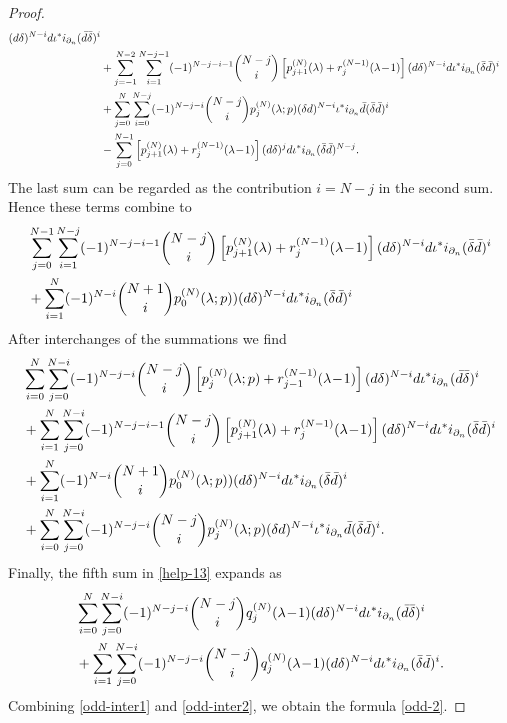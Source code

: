 \documentclass[a4paper,12pt,reqno]{amsart}
\numberwithin{theorem}{subsection}
\numberwithin{equation}{section}
\begin{document}
\begin{proof}
\begin{align*}
   ({d}\delta)^{N-i} {d} \iota^* i_{\partial_n} (\bar{d}\bar{\delta})^i \\
   & + \sum_{j=-1}^{N-2} \sum_{i=1}^{N-j-1} (-1)^{N-j-i-1}  \binom{N-j}{i}
   \left[p_{j+1}^{(N)}(\lambda) + r_{j}^{(N-1)}(\lambda\!-\!1)\right]
   ({d}\delta)^{N-i} {d} \iota^* i_{\partial_n} (\bar{\delta}\bar{d})^i \notag \\
   & + \sum_{j=0}^N \sum_{i=0}^{N-j}(-1)^{N-j-i} \binom{N-j}{i} p_j^{(N)}(\lambda;p)
   (\delta{d})^{N-i} \iota^* i_{\partial_n} \bar{d}(\bar{\delta}\bar{d})^i \\
   & - \sum_{j=0}^{N-1} \left[p_{j+1}^{(N)}(\lambda) + r_{j}^{(N-1)}(\lambda\!-\!1)\right]
   ({d} \delta)^{j} {d} \iota^* i_{\partial_n} (\bar{\delta}\bar{d})^{N-j}.
\end{align*}
The last sum can be regarded as the contribution $i=N-j$ in the second sum.
Hence these terms combine to
\begin{align*}
   & \sum_{j=0}^{N-1} \sum_{i=1}^{N-j} (-1)^{N-j-i-1}  \binom{N-j}{i}
   \left[p_{j+1}^{(N)}(\lambda) + r_{j}^{(N-1)}(\lambda\!-\!1)\right]
   ({d}\delta)^{N-i} {d} \iota^* i_{\partial_n} (\bar{\delta}\bar{d})^i \notag \\
   & + \sum_{i=1}^N(-1)^{N-i} \binom{N+1}{i} p_0^{(N)}(\lambda;p))
   ({d}\delta)^{N-i} {d} \iota^* i_{\partial_n} (\bar{\delta}\bar{d})^i
\end{align*}
After interchanges of the summations we find
\begin{align}\label{odd-inter1}
   & \sum_{i=0}^N \sum_{j=0}^{N-i}(-1)^{N-j-i} \binom{N-j}{i}
   \left[p_j^{(N)}(\lambda;p) + r_{j-1}^{(N-1)}(\lambda\!-\!1)\right]
   ({d}\delta)^{N-i} {d} \iota^* i_{\partial_n} (\bar{d}\bar{\delta})^i \notag \\
   & + \sum_{i=1}^N \sum_{j=0}^{N-i} (-1)^{N-j-i-1} \binom{N-j}{i}
   \left[p_{j+1}^{(N)}(\lambda)+r_{j}^{(N-1)}(\lambda\!-\!1)\right]
   ({d}\delta)^{N-i} {d} \iota^* i_{\partial_n} (\bar{\delta}\bar{d})^i \notag \\
   & + \sum_{i=1}^N(-1)^{N-i} \binom{N+1}{i} p_0^{(N)}(\lambda;p))
   ({d}\delta)^{N-i} {d} \iota^* i_{\partial_n} (\bar{\delta}\bar{d})^i \notag \\
   & + \sum_{i=0}^N\sum_{j=0}^{N-i}(-1)^{N-j-i} \binom{N-j}{i} p_j^{(N)}(\lambda;p)
   (\delta{d})^{N-i} \iota^* i_{\partial_n} \bar{d}(\bar{\delta}\bar{d})^i.
\end{align}
Finally, the fifth sum in \eqref{help-13} expands as
\begin{align}\label{odd-inter2}
   & \sum_{i=0}^N \sum_{j=0}^{N-i}(-1)^{N-j-i} \binom{N-j}{i}q_j^{(N)}(\lambda\!-\!1)
   ({d}\delta)^{N-i} {d} \iota^* i_{\partial_n} (\bar{d}\bar{\delta})^i \notag \\
   & + \sum_{i=1}^N\sum_{j=0}^{N-i}(-1)^{N-j-i} \binom{N-j}{i}q_{j}^{(N)}(\lambda\!-\!1)
   ({d}\delta)^{N-i} {d} \iota^* i_{\partial_n} (\bar{\delta}\bar{d})^i.
\end{align}
Combining \eqref{odd-inter1} and \eqref{odd-inter2}, we obtain the formula
\eqref{odd-2}.


\end{proof}
\end{document}
